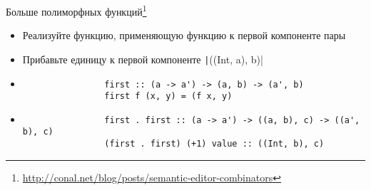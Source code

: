     \begin{frame}[fragile]{Больше полиморфных функций\footnote{\color{blue}\url{http://conal.net/blog/posts/semantic-editor-combinators}}}
        \begin{itemize}
            \item[\todo] Реализуйте функцию, применяющую функцию к первой компоненте пары
            \item[\todo] Прибавьте единицу к первой компоненте \texttt|((Int, a), b)|
            \item[\answer] \pause
            \begin{verbatim}
                first :: (a -> a') -> (a, b) -> (a', b)
                first f (x, y) = (f x, y)
            \end{verbatim}
            \item[\answer] \pause
            \begin{verbatim}
                first . first :: (a -> a') -> ((a, b), c) -> ((a', b), c)
                (first . first) (+1) value :: ((Int, b), c)
            \end{verbatim}
        \end{itemize}
    \end{frame}


